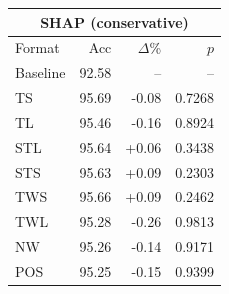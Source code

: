 \begin{tabular}{lrrr}
\toprule
\multicolumn{4}{c}{\textbf{SHAP (conservative)}} \\
\midrule
Format & Acc & $\Delta$\% & $p$ \\
\midrule
Baseline & 92.58 & -- & -- \\
\midrule
TS & 95.69 & -0.08 & 0.7268 \\
TL & 95.46 & -0.16 & 0.8924 \\
STL & 95.64 & +0.06 & 0.3438 \\
STS & 95.63 & +0.09 & 0.2303 \\
TWS & 95.66 & +0.09 & 0.2462 \\
TWL & 95.28 & -0.26 & 0.9813 \\
NW & 95.26 & -0.14 & 0.9171 \\
POS & 95.25 & -0.15 & 0.9399 \\
\bottomrule
\end{tabular}